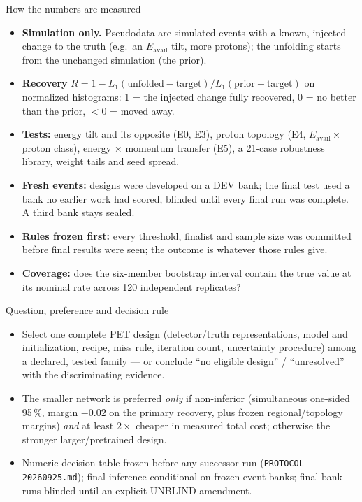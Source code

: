 \documentclass[aspectratio=169,10pt]{beamer}
\def\evidencetext{}
\begin{document}
\gdef\evidencetext{\texttt{PROTOCOL-20260925.md (3, 4, 6, 9)}}
\begin{frame}{How the numbers are measured}
\small\begin{itemize}
\item \textbf{Simulation only.} Pseudodata are simulated events with a known, injected change to the truth (e.g.\ an
  $E_\mathrm{avail}$ tilt, more protons); the unfolding starts from the unchanged simulation (the prior).
\item \textbf{Recovery} $R = 1 - L_1(\text{unfolded} - \text{target}) / L_1(\text{prior} - \text{target})$ on
  normalized histograms: 1 = the injected change fully recovered, 0 = no better than the prior, $< 0$ = moved away.
\item \textbf{Tests:} energy tilt and its opposite (E0, E3), proton topology (E4, $E_\mathrm{avail} \times$ proton
  class), energy $\times$ momentum transfer (E5), a 21-case robustness library, weight tails and seed spread.
\item \textbf{Fresh events:} designs were developed on a DEV bank; the final test used a bank no earlier work had
  scored, blinded until every final run was complete. A third bank stays sealed.
\item \textbf{Rules frozen first:} every threshold, finalist and sample size was committed before final results were
  seen; the outcome is whatever those rules give.
\item \textbf{Coverage:} does the six-member bootstrap interval contain the true value at its nominal rate across 120
  independent replicates?
\end{itemize}
\end{frame}

\gdef\evidencetext{\texttt{PROTOCOL-20260925.md}}
\begin{frame}{Question, preference and decision rule}
\begin{itemize}\small
\item Select one complete PET design (detector/truth representations, model and initialization, recipe,
  miss rule, iteration count, uncertainty procedure) among a declared, tested family --- or conclude
  ``no eligible design'' / ``unresolved'' with the discriminating evidence.
\item The smaller network is preferred \emph{only} if non-inferior (simultaneous one-sided 95\,\%, margin
  $-0.02$ on the primary recovery, plus frozen regional/topology margins) \emph{and} at least $2\times$
  cheaper in measured total cost; otherwise the stronger larger/pretrained design.
\item Numeric decision table frozen before any successor run (\texttt{PROTOCOL-20260925.md}); final
  inference conditional on frozen event banks; final-bank runs blinded until an explicit UNBLIND
  amendment.
\end{itemize}
\end{frame}
\end{document}
